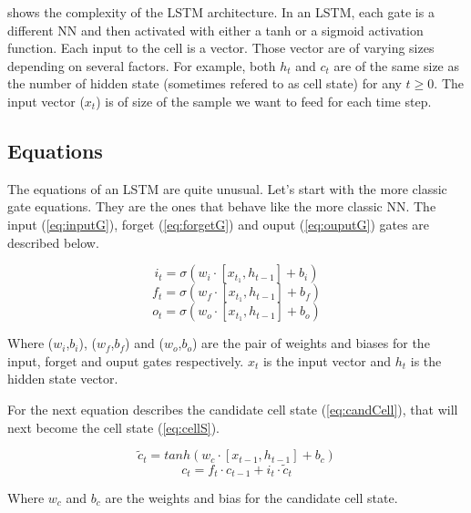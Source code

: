  shows the complexity of the \ac{LSTM} architecture. In an \ac{LSTM}, each gate is a different \ac{NN} and then activated with either a \ac{tanh} or a sigmoid activation function. Each input to the cell is a vector.
Those vector are of varying sizes depending on several factors. For example, both $h_t$ and $c_t$ are of the same size as the number of hidden state (sometimes refered to as cell state) for any $t\geq 0$.
The input vector ($x_t$) is of size of the sample we want to feed for each time step.

\subsection{Equations}

The equations of an LSTM are quite unusual.
Let's start with the more classic gate equations. They are the ones that behave like the more classic \ac{NN}.
The input (\cref{eq:inputG}), forget (\cref{eq:forgetG}) and ouput (\cref{eq:ouputG}) gates are described below.

\begin{equation}\label{eq:inputG}
  i_t=\sigma (w_i\cdot[x_{t_1},h_{t-1}] + b_i)
\end{equation}
\begin{equation}\label{eq:forgetG}
  f_t=\sigma (w_f\cdot[x_{t_1},h_{t-1}] + b_f)
\end{equation}
\begin{equation}\label{eq:ouputG}
  o_t=\sigma (w_o\cdot[x_{t_1},h_{t-1}] + b_o)
\end{equation}

Where ($w_i$,$b_i$), ($w_f$,$b_f$) and ($w_o$,$b_o$) are the pair of weights and biases for the input, forget and ouput gates respectively. $x_t$ is the input vector and $h_t$ is the hidden state vector.

For the next equation describes the candidate cell state (\cref{eq:candCell}), that will next become the cell state (\cref{eq:cellS}).

\begin{equation}\label{eq:candCell}
  \tilde{c}_t=tanh(w_c\cdot[x_{t-1},h_{t-1}] + b_c)
\end{equation}
\begin{equation}\label{eq:cellS}
  c_t=f_t\cdot c_{t-1} + i_t \cdot \tilde{c}_t
\end{equation}

Where $w_c$ and $b_c$ are the weights and bias for the candidate cell state.

